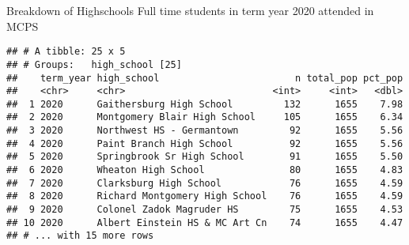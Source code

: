 \documentclass[]{article}
\newenvironment{Shaded}{\begin{snugshade}}{\end{snugshade}}
\newcommand{\DataTypeTok}[1]{\textcolor[rgb]{0.13,0.29,0.53}{#1}}
\newcommand{\DecValTok}[1]{\textcolor[rgb]{0.00,0.00,0.81}{#1}}
\newcommand{\KeywordTok}[1]{\textcolor[rgb]{0.13,0.29,0.53}{\textbf{#1}}}
\newcommand{\NormalTok}[1]{#1}
\newcommand{\OperatorTok}[1]{\textcolor[rgb]{0.81,0.36,0.00}{\textbf{#1}}}
\newcommand{\OtherTok}[1]{\textcolor[rgb]{0.56,0.35,0.01}{#1}}
\newcommand{\StringTok}[1]{\textcolor[rgb]{0.31,0.60,0.02}{#1}}
\begin{document}
Breakdown of Highschools Full time students in term year 2020 attended
in MCPS

\begin{Shaded}
\end{Shaded}

\begin{verbatim}
## # A tibble: 25 x 5
## # Groups:   high_school [25]
##    term_year high_school                        n total_pop pct_pop
##    <chr>     <chr>                          <int>     <int>   <dbl>
##  1 2020      Gaithersburg High School         132      1655    7.98
##  2 2020      Montgomery Blair High School     105      1655    6.34
##  3 2020      Northwest HS - Germantown         92      1655    5.56
##  4 2020      Paint Branch High School          92      1655    5.56
##  5 2020      Springbrook Sr High School        91      1655    5.50
##  6 2020      Wheaton High School               80      1655    4.83
##  7 2020      Clarksburg High School            76      1655    4.59
##  8 2020      Richard Montgomery High School    76      1655    4.59
##  9 2020      Colonel Zadok Magruder HS         75      1655    4.53
## 10 2020      Albert Einstein HS & MC Art Cn    74      1655    4.47
## # ... with 15 more rows
\end{verbatim}
\end{document}
